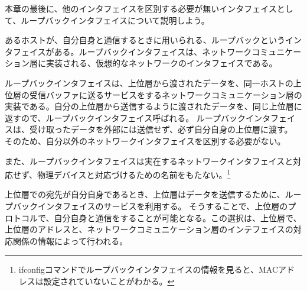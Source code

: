 本章の最後に、他のインタフェイスを区別する必要が無いインタフェイスとして、ループバックインタフェイスについて説明しよう。

あるホストが、自分自身と通信するときに用いられる、ループバックというインタフェイスがある。ループバックインタフェイスは、ネットワークコミュニケーション層に実装される、仮想的なネットワークのインタフェイスである。

ループバックインタフェイスは、上位層から渡されたデータを、同一ホストの上位層の受信バッファに送るサービスをするネットワークコミュニケーション層の実装である。自分の上位層から送信するように渡されたデータを、同じ上位層に返すので、ループバックインタフェイス呼ばれる。
ループバックインタフェイスは、受け取ったデータを外部には送信せず、必ず自分自身の上位層に渡す。
そのため、自分以外のネットワークインタフェイスを区別する必要がない。

また、ループバックインタフェイスは実在するネットワークインタフェイスと対応せず、物理デバイスと対応づけるための名前をもたない。\footnote{ifconfigコマンドでループバックインタフェイスの情報を見ると、MACアドレスは設定されていないことがわかる。}

上位層での宛先が自分自身であるとき、上位層はデータを送信するために、ループバックインタフェイスのサービスを利用する。
そうすることで、上位層のプロトコルで、自分自身と通信をすることが可能となる。この選択は、上位層で、上位層のアドレスと、ネットワークコミュニケーション層のインテフェイスの対応関係の情報によって行われる。

